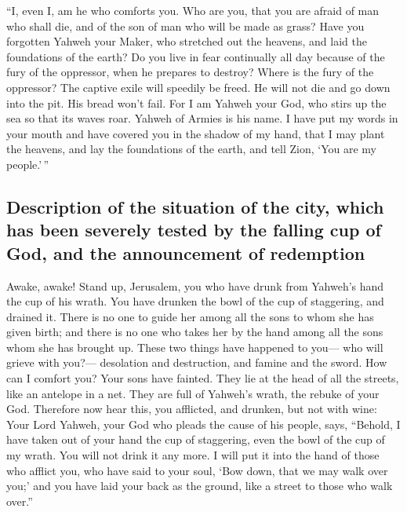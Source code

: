  ``I, even I, am he who comforts you. Who are you, that
you are afraid of man who shall die, and of the son of man who will be
made as grass?  Have you forgotten Yahweh your Maker, who
stretched out the heavens, and laid the foundations of the earth? Do you
live in fear continually all day because of the fury of the oppressor,
when he prepares to destroy? Where is the fury of the oppressor?
 The captive exile will speedily be freed. He will not
die and go down into the pit. His bread won't fail.  For
I am Yahweh your God, who stirs up the sea so that its waves roar.
Yahweh of Armies is his name.  I have put my words in
your mouth and have covered you in the shadow of my hand, that I may
plant the heavens, and lay the foundations of the earth, and tell Zion,
`You are my people.'\,''

\hypertarget{description-of-the-situation-of-the-city-which-has-been-severely-tested-by-the-falling-cup-of-god-and-the-announcement-of-redemption}{%
\subsection{Description of the situation of the city, which has been
severely tested by the falling cup of God, and the announcement of
redemption}\label{description-of-the-situation-of-the-city-which-has-been-severely-tested-by-the-falling-cup-of-god-and-the-announcement-of-redemption}}

 Awake, awake! Stand up, Jerusalem, you who have drunk
from Yahweh's hand the cup of his wrath. You have drunken the bowl of
the cup of staggering, and drained it.  There is no one
to guide her among all the sons to whom she has given birth; and there
is no one who takes her by the hand among all the sons whom she has
brought up.  These two things have happened to you--- who
will grieve with you?--- desolation and destruction, and famine and the
sword. How can I comfort you?  Your sons have fainted.
They lie at the head of all the streets, like an antelope in a net. They
are full of Yahweh's wrath, the rebuke of your God. 
Therefore now hear this, you afflicted, and drunken, but not with wine:
 Your Lord Yahweh, your God who pleads the cause of his
people, says, ``Behold, I have taken out of your hand the cup of
staggering, even the bowl of the cup of my wrath. You will not drink it
any more.  I will put it into the hand of those who
afflict you, who have said to your soul, `Bow down, that we may walk
over you;' and you have laid your back as the ground, like a street to
those who walk over.''

